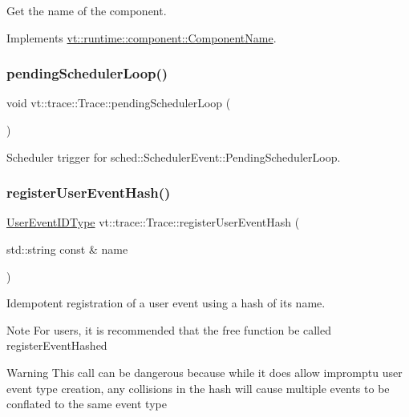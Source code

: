 Get the name of the component. 



Implements \hyperlink{structvt_1_1runtime_1_1component_1_1_component_name_a33c06229bb605a2b2ceff68830d6d773}{vt\+::runtime\+::component\+::\+Component\+Name}.

\mbox{\label{structvt_1_1trace_1_1_trace_a5552347220b63160248f1ff5f14845f3}} 
\subsubsection{\texorpdfstring{pending\+Scheduler\+Loop()}{pendingSchedulerLoop()}}
{\footnotesize\ttfamily void vt\+::trace\+::\+Trace\+::pending\+Scheduler\+Loop (\begin{DoxyParamCaption}{ }\end{DoxyParamCaption})}



Scheduler trigger for {\ttfamily sched\+::\+Scheduler\+Event\+::\+Pending\+Scheduler\+Loop}. 

\mbox{\label{structvt_1_1trace_1_1_trace_a1b80a8ca6bebbfbe61f8b119342e14f7}} 
\subsubsection{\texorpdfstring{register\+User\+Event\+Hash()}{registerUserEventHash()}}
{\footnotesize\ttfamily \hyperlink{namespacevt_1_1trace_a5908920d051c144c89f17c69ed262350}{User\+Event\+I\+D\+Type} vt\+::trace\+::\+Trace\+::register\+User\+Event\+Hash (\begin{DoxyParamCaption}\item[{std\+::string const \&}]{name }\end{DoxyParamCaption})}



Idempotent registration of a user event using a hash of its name. 

\begin{DoxyNote}{Note}
For users, it is recommended that the free function be called {\ttfamily register\+Event\+Hashed} 
\end{DoxyNote}
\begin{DoxyWarning}{Warning}
This call can be dangerous because while it does allow impromptu user event type creation, any collisions in the hash will cause multiple events to be conflated to the same event type
\end{DoxyWarning}

